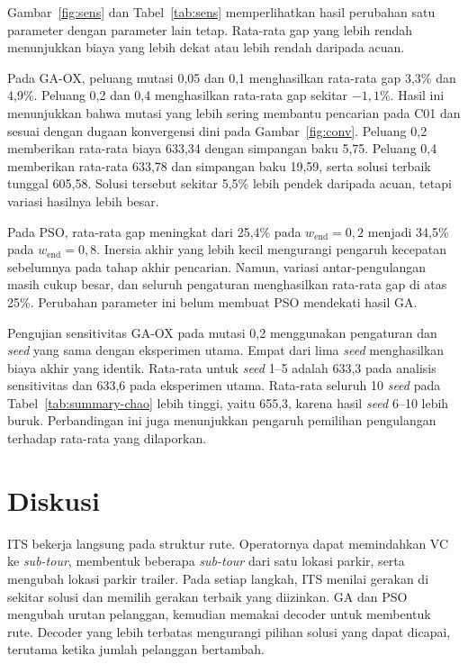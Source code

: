 \documentclass[conference]{IEEEtran}
\begin{document}
Gambar~\ref{fig:sens} dan Tabel~\ref{tab:sens} memperlihatkan hasil perubahan satu parameter dengan parameter lain tetap. Rata-rata gap yang lebih rendah menunjukkan biaya yang lebih dekat atau lebih rendah daripada acuan.

Pada GA-OX, peluang mutasi 0,05 dan 0,1 menghasilkan rata-rata gap 3,3\% dan 4,9\%. Peluang 0,2 dan 0,4 menghasilkan rata-rata gap sekitar $-1{,}1\%$. Hasil ini menunjukkan bahwa mutasi yang lebih sering membantu pencarian pada C01 dan sesuai dengan dugaan konvergensi dini pada Gambar~\ref{fig:conv}. Peluang 0,2 memberikan rata-rata biaya 633,34 dengan simpangan baku 5,75. Peluang 0,4 memberikan rata-rata 633,78 dan simpangan baku 19,59, serta solusi terbaik tunggal 605,58. Solusi tersebut sekitar 5,5\% lebih pendek daripada acuan, tetapi variasi hasilnya lebih besar.

Pada PSO, rata-rata gap meningkat dari 25,4\% pada $w_{\text{end}}=0{,}2$ menjadi 34,5\% pada $w_{\text{end}}=0{,}8$. Inersia akhir yang lebih kecil mengurangi pengaruh kecepatan sebelumnya pada tahap akhir pencarian. Namun, variasi antar-pengulangan masih cukup besar, dan seluruh pengaturan menghasilkan rata-rata gap di atas 25\%. Perubahan parameter ini belum membuat PSO mendekati hasil GA.

Pengujian sensitivitas GA-OX pada mutasi 0,2 menggunakan pengaturan dan \textit{seed} yang sama dengan eksperimen utama. Empat dari lima \textit{seed} menghasilkan biaya akhir yang identik. Rata-rata untuk \textit{seed} 1--5 adalah 633,3 pada analisis sensitivitas dan 633,6 pada eksperimen utama. Rata-rata seluruh 10 \textit{seed} pada Tabel~\ref{tab:summary-chao} lebih tinggi, yaitu 655,3, karena hasil \textit{seed} 6--10 lebih buruk. Perbandingan ini juga menunjukkan pengaruh pemilihan pengulangan terhadap rata-rata yang dilaporkan.

\section{Diskusi}\label{sec:diskusi}

ITS bekerja langsung pada struktur rute. Operatornya dapat memindahkan VC ke \textit{sub-tour}, membentuk beberapa \textit{sub-tour} dari satu lokasi parkir, serta mengubah lokasi parkir trailer. Pada setiap langkah, ITS menilai gerakan di sekitar solusi dan memilih gerakan terbaik yang diizinkan. GA dan PSO mengubah urutan pelanggan, kemudian memakai decoder untuk membentuk rute. Decoder yang lebih terbatas mengurangi pilihan solusi yang dapat dicapai, terutama ketika jumlah pelanggan bertambah.
\end{document}
